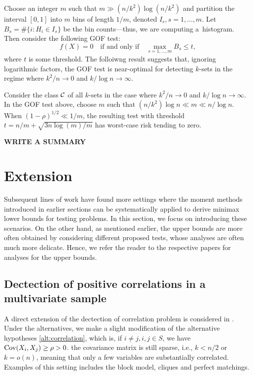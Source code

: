 \documentclass[10pt, oneside]{article}
\begin{document}
Choose an integer $m$ such that $m \gg(n/k^2) \log(n/k^2)$ and partition
the interval $[0,1]$ into $m$ bins of length $1/m$, denoted $I_s,  s =
1,\ldots, m$. Let $B_s = \# \{i: H_i \in I_s\}$ be the bin
counts---thus, we are computing a~histogram. Then consider the
following GOF test:
%
\[
f(X)=0  \quad\mbox{if and only if}\quad
\max_{s = 1,\ldots, m} B_s \leq t,
\]
%
where $t$ is some threshold. The folloiwng result suggests that, ignoring logarithmic factors, the GOF test is near-optimal for detecting $k$-sets in
the regime where $k^2/n \to0$ and $k/\log n \to\infty$.

\begin{prop} \label{prpgof}
Consider the class ${\mathcal C}$ of all $k$-sets in the case where $k^2/n \to
0$ and $k/\log n \to\infty$. In the GOF test above, choose $m$ such
that $(n/k^2) \log n \ll m \ll n/\log n$. When $(1-\rho)^{1/2} \ll
1/m$, the resulting test with threshold $t = n/m + \sqrt{3 n \log(m)/m}$ has
worst-case risk tending to zero.
\end{prop}

{\bf WRITE A SUMMARY}

\section{Extension}

Subsequent lines of work have found more settings where the moment methods introduced in earlier sections can be systematically applied to derive minimax lower bounds for testing problems. In this section, we focus on introducing these scenarios. 
On the other hand, as mentioned earlier, the upper bounds are more often obtained by considering different proposed tests, whose analyses are often much more delicate. Hence, we refer the reader to the respective papers for analyses for the upper bounds.

\subsection{Dectection of positive correlations in a multivariate sample}
A direct extension of the dectection of correlation problem is considered in \cite{arias2015correlations}. Under the alternatives, we make a slight modification of the alternative hypotheses \ref{alt:correlation}, which is, if $i \ne j, i,j \in S$, we have $\operatorname{Cov}(X_i, X_j) \ge \rho > 0$.  the covariance matrix is still sparse, i.e., $k < n/2$ or $k = o(n)$, meaning that only a few variables are substantially correlated. Examples of this setting includes the block model, cliques and perfect matchings. 
\end{document}

